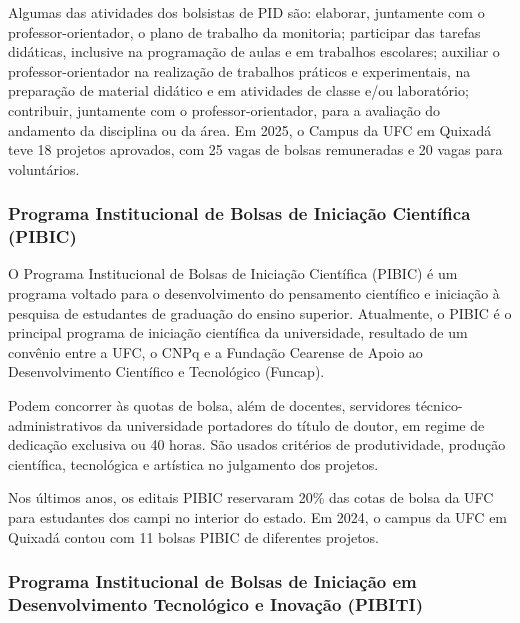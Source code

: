 Algumas das atividades dos bolsistas de PID são: elaborar, juntamente com o professor-orientador, o plano de trabalho da monitoria; participar das tarefas didáticas, inclusive na programação de aulas e em trabalhos escolares; auxiliar o professor-orientador na realização de trabalhos práticos e experimentais, na preparação de material didático e em atividades de classe e/ou laboratório; contribuir, juntamente com o professor-orientador, para a avaliação do andamento da disciplina ou da área. Em 2025, o Campus da UFC em Quixadá teve 18 projetos aprovados, com 25 vagas de bolsas remuneradas e 20 vagas para voluntários.


\subsubsection{Programa Institucional de Bolsas de Iniciação Científica (PIBIC)}

O Programa Institucional de Bolsas de Iniciação Científica (PIBIC) é um programa voltado para o desenvolvimento do pensamento científico e iniciação à pesquisa de estudantes de graduação do ensino superior. Atualmente, o PIBIC é o principal programa de iniciação científica da universidade, resultado de um convênio entre a UFC, o CNPq e a Fundação Cearense de Apoio ao Desenvolvimento Científico e Tecnológico (Funcap).



Podem concorrer às quotas de bolsa, além de docentes, servidores técnico-administrativos da universidade portadores do título de doutor, em regime de dedicação exclusiva ou 40 horas. São usados critérios de produtividade, produção científica, tecnológica e artística no julgamento dos projetos.

Nos últimos anos, os editais PIBIC reservaram 20\% das cotas de bolsa da UFC para estudantes dos campi no interior do estado. Em 2024, o campus da UFC em Quixadá contou com 11 bolsas PIBIC de diferentes projetos. 

\subsubsection{ Programa Institucional de Bolsas de Iniciação em Desenvolvimento Tecnológico e Inovação (PIBITI)}

